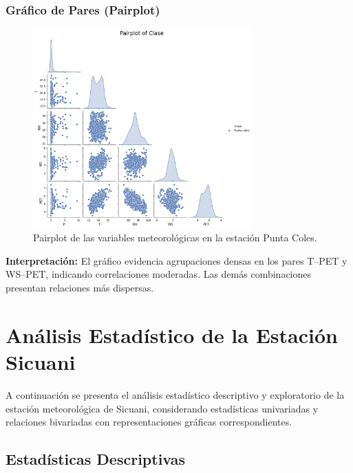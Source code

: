 \subsubsection*{Gráfico de Pares (Pairplot)}
\begin{figure}[htbp]
\centering
\includegraphics[width=0.75\textwidth]{resultados/por_estacion_meteorologica/Punta_Coles/pairplot.png}
\caption{Pairplot de las variables meteorológicas en la estación Punta Coles.}
\label{fig:punta_coles_pairplot}
\end{figure}
\textbf{Interpretación:} El gráfico evidencia agrupaciones densas en los pares T–PET y WS–PET, indicando correlaciones moderadas. Las demás combinaciones presentan relaciones más dispersas.


\section{Análisis Estadístico de la Estación Sicuani}

A continuación se presenta el análisis estadístico descriptivo y exploratorio de la estación meteorológica de Sicuani, considerando estadísticas univariadas y relaciones bivariadas con representaciones gráficas correspondientes.

\subsection{Estadísticas Descriptivas}

